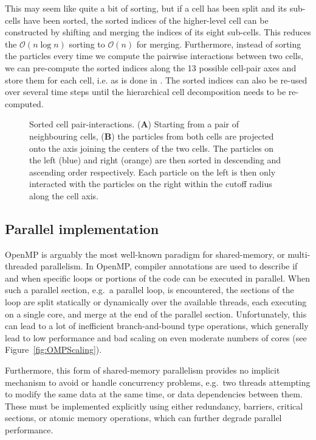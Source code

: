 \documentclass[a4paper,conference]{IEEEtran}
\newcommand{\oh}[1]
    {\mbox{$ {\mathcal O}( #1 ) $}}
\newcommand{\fig}[1]
    {Figure~\ref{fig:#1}}
\newcommand{\bsf}[1]
    {\textbf{\textsf{#1}}}
\begin{document}
This may seem like quite a bit of sorting, but
if a cell has been split and its sub-cells have been sorted,
the sorted indices of the higher-level cell can be constructed
by shifting and merging the indices of its eight sub-cells.
This reduces the \oh{n\log{n}} sorting to \oh{n} for merging. 
Furthermore, instead of sorting the particles every time we compute the
pairwise interactions between two cells, we can pre-compute
the sorted indices along the 13 possible cell-pair axes and
store them for each cell, i.e. as is done in \cite{ref:Gonnet2013}.
The sorted indices can also be re-used over several time steps
until the hierarchical cell decomposition needs to be
re-computed.


\begin{figure}
    \centerline{}
    
    \caption{Sorted cell pair-interactions. ({\bsf A}) Starting from a pair of
        neighbouring cells, ({\bsf B}) the particles from both cells
        are projected onto the axis joining the centers of the two cells.
        The particles on the left (blue) and right (orange) are
        then sorted in descending and ascending order respectively.
        Each particle on the left is then only interacted with
        the particles on the right within the cutoff radius along the cell axis.
        }
    \label{fig:SortedInteractions}
\end{figure}


\subsection{Parallel implementation}

OpenMP \cite{ref:Dagum1998} is arguably the most well-known
paradigm for shared-memory, or multi-threaded parallelism.
In OpenMP, compiler annotations are used to describe if and when
specific loops or portions of the code can be executed
in parallel.
When such a parallel section, e.g.~a parallel loop, is
encountered, the sections of the loop are split statically
or dynamically over the available threads, each executing
on a single core, and merge at the end of the parallel section.
Unfortunately, this can lead to a lot of inefficient
branch-and-bound type operations, which generally lead to
low performance and bad scaling on even moderate numbers
of cores (see \fig{OMPScaling}).

Furthermore, this form of shared-memory parallelism provides
no implicit mechanism to avoid or handle concurrency problems,
e.g.~two threads attempting to modify the same data at the same time,
or data dependencies between them.
These must be implemented explicitly using either redundancy, barriers,
critical sections, or atomic memory operations, which can further degrade
parallel performance.
\end{document}
